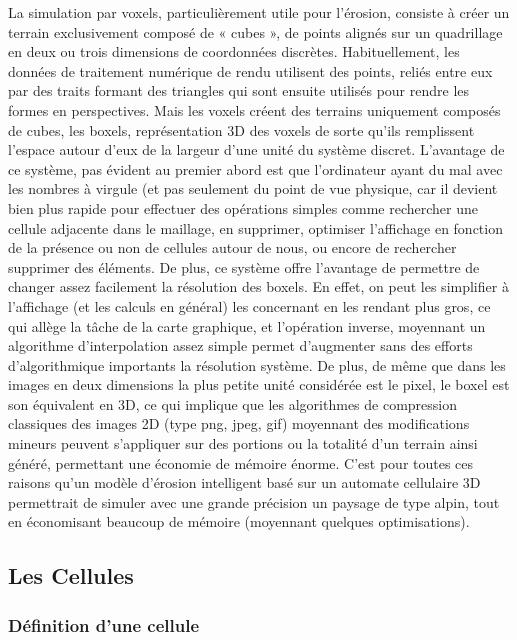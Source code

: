 \documentclass[a4paper,11pt]{article}
\begin{document}
La simulation par voxels, particulièrement utile pour l'érosion, consiste à créer un terrain exclusivement composé de « cubes », de points alignés sur un quadrillage en deux ou trois dimensions de coordonnées discrètes.
Habituellement, les données de traitement numérique de rendu utilisent des points, reliés entre eux par des traits formant des triangles qui sont ensuite utilisés pour rendre les formes en perspectives.
Mais les voxels créent des terrains uniquement composés de cubes, les boxels, représentation 3D des voxels de sorte qu'ils remplissent l'espace autour d'eux de la largeur d'une unité du système discret.
L'avantage de ce système, pas évident au premier abord est que l'ordinateur ayant du mal avec les nombres à virgule (et pas seulement du point de vue physique, car il devient bien plus rapide pour effectuer des opérations simples comme rechercher une cellule adjacente dans le maillage, en supprimer, optimiser l'affichage en fonction de la présence ou non de cellules autour de nous, ou encore de rechercher supprimer des éléments.
De plus, ce système offre l'avantage de permettre de changer assez facilement la résolution des boxels.
En effet, on peut les simplifier à l'affichage (et les calculs en général) les concernant en les rendant plus gros, ce qui allège la tâche de la carte graphique, et l'opération inverse, moyennant un algorithme d'interpolation assez simple permet d'augmenter sans des efforts d'algorithmique importants la résolution système.
De plus, de même que dans les images en deux dimensions la plus petite unité considérée est le pixel, le boxel est son équivalent en 3D, ce qui implique que les algorithmes de compression classiques des images 2D (type png, jpeg, gif) moyennant des modifications mineurs peuvent s'appliquer sur des portions ou la totalité d'un terrain ainsi généré, permettant une économie de mémoire énorme.
C'est pour toutes ces raisons qu'un modèle d'érosion intelligent basé sur un automate cellulaire 3D permettrait de simuler avec une grande précision un paysage de type alpin, tout en économisant beaucoup de mémoire (moyennant quelques optimisations).

\subsection{Les Cellules}
\subsubsection{Définition d'une cellule}
\end{document}
